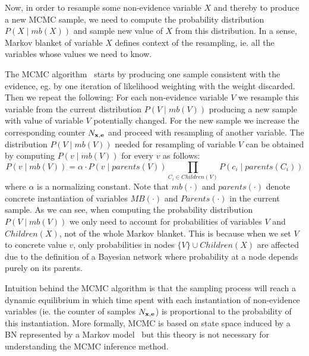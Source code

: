 \documentclass[english,cover]{fitthesis} %
\newcommand{\vars}[1]{{\bold{#1}}}         %
\newcommand{\note}[1]{{\color{green}#1}}
\begin{document}
Now, in order to resample some non-evidence variable $X$ and thereby to produce a new MCMC sample, we need to compute the probability distribution $P(X \mid mb(X))$ and sample new value of $X$ from this distribution. In a sense, Markov blanket of variable $X$ defines context of the resampling, ie. all the variables whose values we need to know.

The MCMC algorithm~\cite[p.~516]{russell_norvig_ed2} starts by producing one sample consistent with the evidence, eg. by one iteration of likelihood weighting with the weight discarded. Then we repeat the following: For each non-evidence variable $V$ we resample this variable from the current distribution $P(V \mid mb(V))$ producing a new sample with value of variable $V$ potentially changed. For the new sample we increase the corresponding counter $N_{\vars{x},\vars{e}}$ and proceed with resampling of another variable. The distribution $P(V \mid mb(V))$ needed for resampling of variable $V$ can be obtained by computing $P(v \mid mb(V))$ for every $v$ as follows:
\begin{equation*}
    P(v \mid mb(V)) = \alpha \cdot P(v \mid parents(V)) \!\!\!\!\!\!\!\! \prod_{C_i \in Children(V)} \!\!\!\!\!\!\!\!\!\!\!\! P(c_i \mid parents(C_i))
\end{equation*}
where $\alpha$ is a normalizing constant. Note that $mb(\cdot)$ and $parents(\cdot)$ denote concrete instantiation of variables $MB(\cdot)$ and $Parents(\cdot)$ in the current sample. As we can see, when computing the probability distribution $P(V \mid mb(V))$ we only need to account for probabilities of variables $V$ and $Children(X)$, not of the whole Markov blanket. This is because when we set $V$ to concrete value $v$, only probabilities in nodes $\lbrace V \rbrace \cup Children(X)$ are affected due to the definition of a Bayesian network where probability at a node depends purely on its parents.

Intuition behind the MCMC algorithm is that the sampling process will reach a dynamic equilibrium in which time spent with each instantiation of non-evidence variables (ie. the counter of samples $N_{\vars{x},\vars{e}}$) is proportional to the probability of this instantiation. More formally, MCMC is based on state space induced by a BN represented by a Markov model~\cite[p.~516]{russell_norvig_ed2} but this theory is not necessary for understanding the MCMC inference method.

\end{document}
